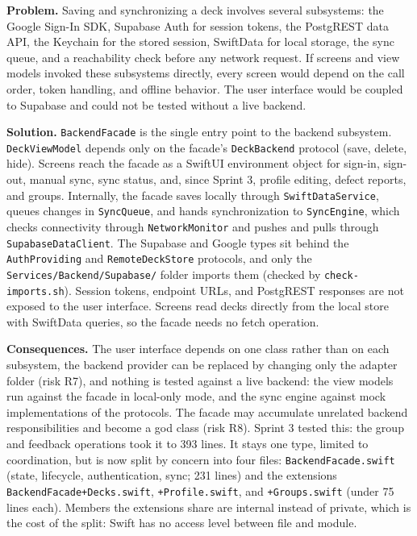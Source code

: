 \documentclass[12pt,letterpaper]{article}
\begin{document}
\textbf{Problem.} Saving and synchronizing a deck involves several subsystems: the
Google Sign-In SDK, Supabase Auth for session tokens, the PostgREST data API, the
Keychain for the stored session, SwiftData for local storage, the sync queue, and a
reachability check before any network request. If screens and view models invoked these
subsystems directly, every screen would depend on the call order, token handling, and
offline behavior. The user interface would be coupled to Supabase and could not be
tested without a live backend.

\textbf{Solution.} \texttt{BackendFacade} is the single entry point to the backend
subsystem. \texttt{DeckViewModel} depends only on the facade's \texttt{DeckBackend}
protocol (save, delete, hide). Screens reach the facade as a SwiftUI environment object
for sign-in, sign-out, manual sync, sync status, and, since Sprint 3, profile editing,
defect reports, and groups. Internally, the facade saves
locally through \texttt{SwiftDataService}, queues changes in \texttt{SyncQueue}, and
hands synchronization to \texttt{SyncEngine}, which checks connectivity through
\texttt{NetworkMonitor} and pushes and pulls through \texttt{SupabaseDataClient}. The
Supabase and Google types sit behind the \texttt{AuthProviding} and
\texttt{RemoteDeckStore} protocols, and only the \texttt{Services/\allowbreak Backend/\allowbreak Supabase/}
folder imports them (checked by \texttt{check-imports.sh}). Session tokens, endpoint
URLs, and PostgREST responses are not exposed to the user interface. Screens read decks
directly from the local store with SwiftData queries, so the facade needs no fetch
operation.

\textbf{Consequences.} The user interface depends on one class rather than on each
subsystem, the backend provider can be replaced by changing only the adapter folder
(risk R7), and nothing is tested against a live backend: the view models run against
the facade in local-only mode, and the sync engine against mock implementations of the
protocols. The facade may accumulate unrelated backend
responsibilities and become a god class (risk R8). Sprint 3 tested this: the group and
feedback operations took it to 393 lines. It stays one type, limited to coordination,
but is now split by concern into four files: \texttt{BackendFacade.swift} (state,
lifecycle, authentication, sync; 231 lines) and the extensions
\texttt{BackendFacade+Decks.swift}, \texttt{+Profile.swift}, and \texttt{+Groups.swift}
(under 75 lines each). Members the extensions share are internal instead of private,
which is the cost of the split: Swift has no access level between file and module.
\end{document}
